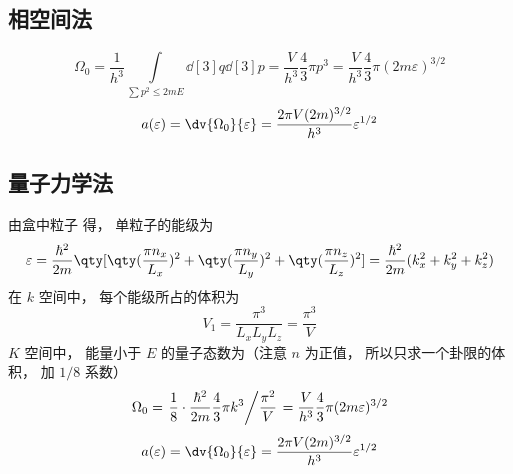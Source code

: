 
\subsection{相空间法}
\begin{equation}
\Omega_0 = \frac{1}{h^3}\int\limits_{\sum {p^2}  \le 2mE} \dd[3]{q} \dd[3]{p}
 = \frac{V}{h^3}\frac{4}{3}\pi {p^3}
 = \frac{V}{h^3}\frac{4}{3}\pi {\left( {2m\varepsilon } \right)^{3/2}}
\end{equation}
\begin{equation}
a(\varepsilon) = \dv{\Omega_0}{\varepsilon} = \frac{2\pi V(2m)^{3/2}}{h^3} \varepsilon^{1/2}
\end{equation}

\subsection{量子力学法}
由盒中粒子%
得， 单粒子的能级为
\begin{equation}
\varepsilon = \frac{\hbar ^2}{2m} \qty[\qty(\frac{\pi n_x}{L_x})^2 + \qty(\frac{\pi n_y}{L_y})^2 + \qty(\frac{\pi n_z}{L_z})^2] = \frac{\hbar ^2}{2m} (k_x^2 + k_y^2 + k_z^2)
\end{equation}
在 $k$ 空间中， 每个能级所占的体积为
\begin{equation}
V_1 = \frac{\pi^3}{L_x L_y L_z} = \frac{\pi^3}{V}
\end{equation}
$K$ 空间中， 能量小于 $E$ 的量子态数为（注意 $n$ 为正值， 所以只求一个卦限的体积， 加 $1/8$ 系数）
\begin{equation}
\Omega_0 = \left. \frac18\cdot \frac{\hbar^2}{2m}\frac43 \pi k^3 \middle/ \frac{\pi^2}{V} \right. = \frac{V}{h^3}\frac43 \pi(2m\varepsilon)^{3/2}
\end{equation}
\begin{equation}
a(\varepsilon) = \dv{\Omega_0}{\varepsilon} = \frac{2\pi V(2m)^{3/2}}{h^3} \varepsilon^{1/2}
\end{equation}

